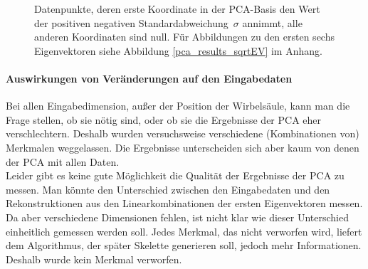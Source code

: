  \begin{figure}
   \qquad
   
   \caption{Datenpunkte, deren erste Koordinate in der PCA-Basis den Wert der positiven \bzw negativen \mbox{Standardabweichung $\sigma$} annimmt, alle anderen Koordinaten sind null. Für Abbildungen zu den ersten sechs Eigenvektoren siehe Abbildung \ref{pca_results_sqrtEV} im Anhang.}
   \label{pca_results_sqrtEV_biggest}
 \end{figure}

 \paragraph{Auswirkungen von Veränderungen auf den Eingabedaten}
 Bei allen Eingabedimension, außer der Position der Wirbelsäule, kann man die Frage stellen, ob sie nötig sind, oder ob sie die Ergebnisse der PCA eher verschlechtern. Deshalb wurden versuchsweise verschiedene (Kombinationen von) Merkmalen weggelassen. Die Ergebnisse unterscheiden sich aber kaum von denen der PCA mit allen Daten. \\
 Leider gibt es keine gute Möglichkeit die Qualität der Ergebnisse der PCA zu messen. Man könnte den Unterschied zwischen den Eingabedaten und den Rekonstruktionen aus den Linearkombinationen der ersten Eigenvektoren messen. Da aber verschiedene Dimensionen fehlen, ist nicht klar wie dieser Unterschied einheitlich gemessen werden soll.
 Jedes Merkmal, das nicht verworfen wird, liefert dem Algorithmus, der später Skelette generieren soll, jedoch mehr Informationen. Deshalb wurde kein Merkmal verworfen.
 
